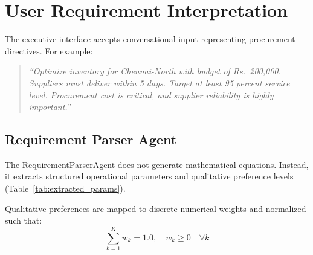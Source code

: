 \documentclass[conference]{IEEEtran}
\begin{document}
\section{User Requirement Interpretation}
The executive interface accepts conversational input representing procurement directives. For example:
\begin{quote}
\textit{``Optimize inventory for Chennai-North with budget of Rs.~200,000. Suppliers must deliver within 5 days. Target at least 95 percent service level. Procurement cost is critical, and supplier reliability is highly important.''}
\end{quote}

\subsection{Requirement Parser Agent}
The RequirementParserAgent does not generate mathematical equations. Instead, it extracts structured operational parameters and qualitative preference levels (Table~\ref{tab:extracted_params}).

\begin{table}[htbp]
\centering
\caption{Extracted Operational Parameters and Canonical Schema}
\label{tab:extracted_params}
\end{table}

Qualitative preferences are mapped to discrete numerical weights and normalized such that:
\begin{equation}
\sum_{k=1}^{K} w_k = 1.0, \quad w_k \ge 0 \quad \forall k
\label{eq:weight_norm}
\end{equation}
\end{document}

